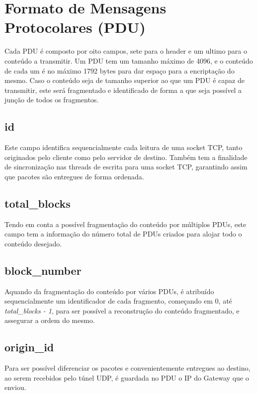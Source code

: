 \documentclass[a4paper]{report}
\begin{document}
\section{Formato de Mensagens Protocolares (PDU)}

Cada PDU é composto por oito campos, sete para o header e um ultimo
para o conteúdo a transmitir. Um PDU tem um tamanho máximo de 4096,
e o conteúdo de cada um é no máximo 1792 bytes para dar espaço para a
encriptação do mesmo. Caso o conteúdo seja de tamanho superior ao que um PDU é
capaz de transmitir, este será fragmentado e identificado de forma a que seja
possível a junção de todos os fragmentos.

\subsection{id}

Este campo identifica sequencialmente cada leitura de uma socket TCP,
tanto originados pelo cliente como pelo servidor de destino. Também 
tem a finalidade de sincronização nas threads de escrita para uma
socket TCP, garantindo assim que pacotes são entregues de forma ordenada.

\subsection{total\_blocks}

Tendo em conta a possível fragmentação do conteúdo por múltiplos PDUs,
este campo tem a informação do número total de PDUs criados para alojar
todo o conteúdo desejado.

\subsection{block\_number}

Aquando da fragmentação do conteúdo por vários PDUs, é atribuído sequencialmente
um identificador de cada fragmento, começando em 0, até \textit{total\_blocks
- 1}, para ser possível a reconstrução do conteúdo fragmentado, e assegurar
a ordem do mesmo.

\subsection{origin\_id}

Para ser possível diferenciar os pacotes e convenientemente entregues ao 
destino, ao serem recebidos pelo túnel UDP, é guardada no PDU o IP do 
Gateway que o enviou.
\end{document}
